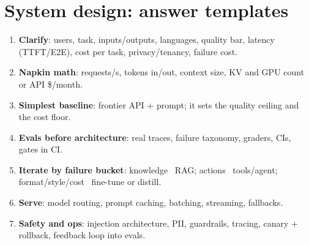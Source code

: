 \section{System design: answer templates}

\begin{center}
\end{center}

\begin{mem}
\begin{enumerate}[leftmargin=1.2em,label=\arabic*.]
\item \textbf{Clarify}: users, task, inputs/outputs, languages, quality bar, latency (TTFT/E2E), cost per task, privacy/tenancy, failure cost.
\item \textbf{Napkin math}: requests/s, tokens in/out, context size, KV and GPU count or API \$/month.
\item \textbf{Simplest baseline}: frontier API + prompt; it sets the quality ceiling and the cost floor.
\item \textbf{Evals before architecture}: real traces, failure taxonomy, graders, CIs, gates in CI.
\item \textbf{Iterate by failure bucket}: knowledge \ra\ RAG; actions \ra\ tools/agent; format/style/cost \ra\ fine-tune or distill.
\item \textbf{Serve}: model routing, prompt caching, batching, streaming, fallbacks.
\item \textbf{Safety and ops}: injection architecture, PII, guardrails, tracing, canary + rollback, feedback loop into evals.
\end{enumerate}
\end{mem}

